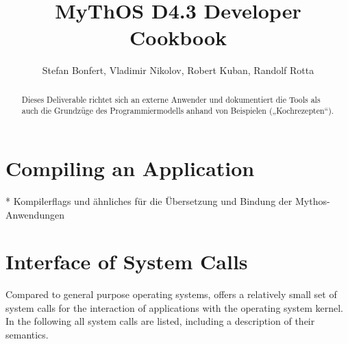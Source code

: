

\title{MyThOS D4.3 Developer Cookbook}
\author{Stefan Bonfert, Vladimir Nikolov, Robert Kuban, Randolf Rotta}



\maketitle

\begin{abstract}
Dieses Deliverable richtet sich an externe Anwender und dokumentiert die Tools als auch die Grundzüge des Programmiermodells anhand von Beispielen („Kochrezepten“).
\end{abstract}

\newpage
\tableofcontents

\section{Compiling an Application}

* Kompilerflags und ähnliches für die Übersetzung und Bindung der
Mythos-Anwendungen

\section{Interface of \mythos System Calls}
Compared to general purpose operating systems, \mythos offers a relatively
small set of system calls for the interaction of applications with the
operating system kernel. In the following all system calls are listed,
including a description of their semantics.


